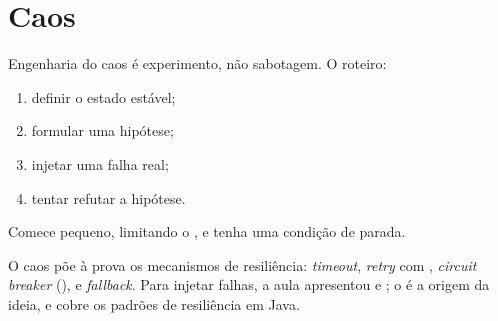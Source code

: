 \section{Caos}

Engenharia do caos é experimento, não sabotagem. O roteiro:

\begin{enumerate}
\item definir o estado estável;
\item formular uma hipótese;
\item injetar uma falha real;
\item tentar refutar a hipótese.
\end{enumerate}

Comece pequeno, limitando o , e
tenha uma condição de parada.

O caos põe à prova os mecanismos de resiliência: \emph{timeout}, \emph{retry}
com , \emph{circuit breaker}
(),  e \emph{fallback}. Para injetar falhas, a aula apresentou
 e ; o
 é a origem da ideia, e
 cobre os padrões de resiliência em Java.
